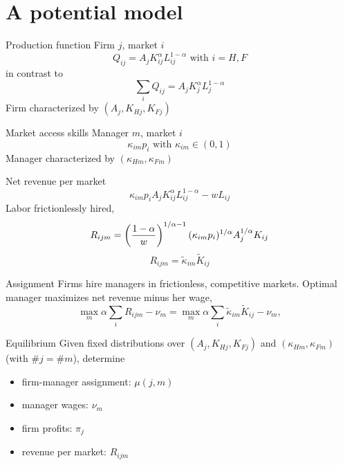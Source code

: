 \documentclass[
  ignorenonframetext,
  aspectratio=43,
]{beamer}
\providecommand{\tightlist}{%
  \setlength{\itemsep}{0pt}\setlength{\parskip}{0pt}}
\begin{document}
\hypertarget{a-potential-model}{%
\section{A potential model}\label{a-potential-model}}

\begin{frame}{Production function}
\protect\hypertarget{production-function}{}
Firm \(j\), market \(i\) \[
Q_{ij}=A_j K_{ij}^\alpha L_{ij}^{1-\alpha}\text{ with } i=H,F
\] in contrast to \[
\sum_iQ_{ij} = A_jK_j^\alpha L_j^{1-\alpha}
\] Firm characterized by \((A_j, K_{Hj}, K_{Fj})\)
\end{frame}

\begin{frame}{Market access skills}
\protect\hypertarget{market-access-skills}{}
Manager \(m\), market \(i\) \[
\kappa_{im}p_i \text{ with }\kappa_{im} \in (0,1)
\] Manager characterized by \((\kappa_{Hm}, \kappa_{Fm})\)
\end{frame}

\begin{frame}{Net revenue per market}
\protect\hypertarget{net-revenue-per-market}{}
\[
\kappa_{im}p_i A_j K_{ij}^{\alpha} L_{ij}^{1-\alpha} - w L_{ij}
\] Labor frictionlessly hired, \[
R_{ijm} =  \left(\frac {1-\alpha} {w}\right)^{1/\alpha-1} 
{(\kappa_{im}p_i)^{1/\alpha}\strut} {A_j^{1/\alpha} K_{ij}\strut}
\] \[
R_{ijm} = \tilde \kappa_{im} \tilde K_{ij}
\]
\end{frame}

\begin{frame}{Assignment}
\protect\hypertarget{assignment}{}
Firms hire managers in frictionless, competitive markets. Optimal
manager maximizes net revenue minus her wage, \[
\max_m \alpha\sum_i R_{ijm} - \nu_m =  \max_m \alpha\sum_i \tilde\kappa_{im}\tilde K_{ij} - \nu_m,
\]
\end{frame}

\begin{frame}{Equilibrium}
\protect\hypertarget{equilibrium}{}
Given fixed distributions over \((A_j, K_{Hj}, K_{Fj})\) and
\((\kappa_{Hm}, \kappa_{Fm})\) (with \(\#j = \#m\)), determine

\begin{itemize}
\tightlist
\item
  firm-manager assignment: \(\mu(j,m)\)
\item
  manager wages: \(\nu_m\)
\item
  firm profits: \(\pi_j\)
\item
  revenue per market: \(R_{ijm}\)
\end{itemize}
\end{frame}
\end{document}
